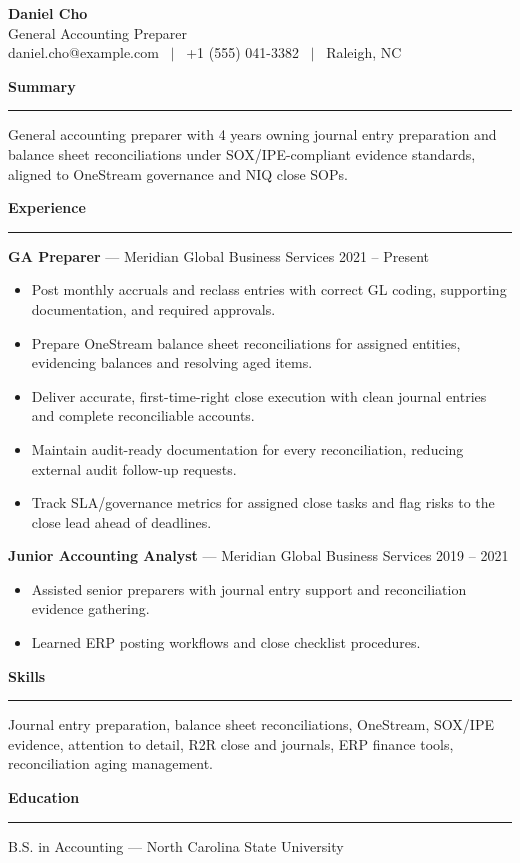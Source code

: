\documentclass[11pt]{article}
\newcommand{\rsection}[1]{%
  \vspace{10pt}
  {\large\bfseries #1}\\[-4pt]
  \rule{\linewidth}{0.6pt}\vspace{4pt}
}
\begin{document}
\begin{center}
  {\Huge\bfseries Daniel Cho}\\[4pt]
  General Accounting Preparer \\
  daniel.cho@example.com \ $\vert$ \ +1 (555) 041-3382 \ $\vert$ \ Raleigh, NC
\end{center}

\rsection{Summary}
General accounting preparer with 4 years owning journal entry preparation and balance sheet reconciliations under SOX/IPE-compliant evidence standards, aligned to OneStream governance and NIQ close SOPs.

\rsection{Experience}
\textbf{GA Preparer} --- Meridian Global Business Services \hfill 2021 -- Present
\begin{itemize}
  \item Post monthly accruals and reclass entries with correct GL coding, supporting documentation, and required approvals.
  \item Prepare OneStream balance sheet reconciliations for assigned entities, evidencing balances and resolving aged items.
  \item Deliver accurate, first-time-right close execution with clean journal entries and complete reconciliable accounts.
  \item Maintain audit-ready documentation for every reconciliation, reducing external audit follow-up requests.
  \item Track SLA/governance metrics for assigned close tasks and flag risks to the close lead ahead of deadlines.
\end{itemize}

\textbf{Junior Accounting Analyst} --- Meridian Global Business Services \hfill 2019 -- 2021
\begin{itemize}
  \item Assisted senior preparers with journal entry support and reconciliation evidence gathering.
  \item Learned ERP posting workflows and close checklist procedures.
\end{itemize}

\rsection{Skills}
Journal entry preparation, balance sheet reconciliations, OneStream, SOX/IPE evidence, attention to detail, R2R close and journals, ERP finance tools, reconciliation aging management.

\rsection{Education}
B.S. in Accounting --- North Carolina State University
\end{document}
